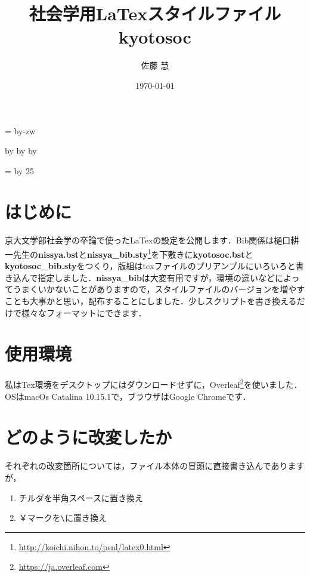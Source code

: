 \documentclass[b5paper, titlepage, 11pt]{jsarticle}
\title{社会学用LaTexスタイルファイルkyotosoc}
\author{佐藤 慧}
\date{\today}
\makeatletter
\def\mojiparline#1{
    \newcounter{mpl}
    \setcounter{mpl}{#1}
    \@tempdima=\linewidth
    \advance\@tempdima by-\value{mpl}zw
    \addtocounter{mpl}{-1}
    \divide\@tempdima by \value{mpl}
    \advance\kanjiskip by\@tempdima
    \advance\parindent by\@tempdima
}
\def\linesparpage#1{
    \baselineskip=\textheight
    \divide\baselineskip by #1
}
\makeatother
\begin{document}
\maketitle

\setcounter{tocdepth}{2}
\tableofcontents

\mojiparline{32}
\linesparpage{25}

\section{はじめに}
京大文学部社会学の卒論で使ったLaTexの設定を公開します．Bib関係は樋口耕一先生の\textbf{nissya.bst}と\textbf{nissya\_bib.sty}\footnote{\url{http://koichi.nihon.to/psnl/latex0.html}}を下敷きに\textbf{kyotosoc.bst}と\textbf{kyotosoc\_bib.sty}をつくり，版組はtexファイルのプリアンブルにいろいろと書き込んで指定しました．\textbf{nissya\_bib}は大変有用ですが，環境の違いなどによってうまくいかないことがありますので，スタイルファイルのバージョンを増やすことも大事かと思い，配布することにしました．少しスクリプトを書き換えるだけで様々なフォーマットにできます．



\section{使用環境}
私はTex環境をデスクトップにはダウンロードせずに，Overleaf\footnote{\url{https://ja.overleaf.com}}を使いました．OSはmacOs Catalina 10.15.1で，ブラウザはGoogle Chromeです．

\section{どのように改変したか}
それぞれの改変箇所については，ファイル本体の冒頭に直接書き込んでありますが，

\begin{enumerate}
    \item チルダを半角スペースに置き換え
    \item ￥マークを\verb|\|に置き換え
\end{enumerate}
\end{document}
